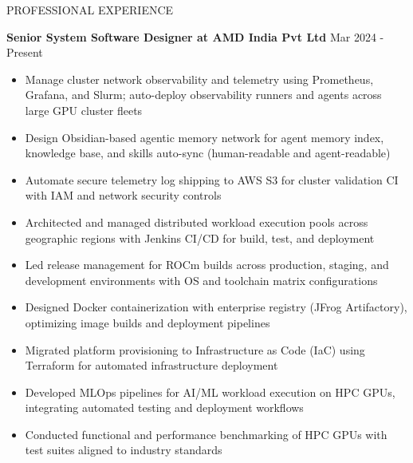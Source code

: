 \documentclass{resume} %
\begin{document}
\begin{rSection}{PROFESSIONAL EXPERIENCE}

{\bf Senior System Software Designer at AMD India Pvt Ltd} \hfill {Mar 2024 - Present }
\begin{itemize}
    \item Manage cluster network observability and telemetry using Prometheus, Grafana, and Slurm; auto-deploy observability runners and agents across large GPU cluster fleets
    \item Design Obsidian-based agentic memory network for agent memory index, knowledge base, and skills auto-sync (human-readable and agent-readable)
    \item Automate secure telemetry log shipping to AWS S3 for cluster validation CI with IAM and network security controls
    \item Architected and managed distributed workload execution pools across geographic regions with Jenkins CI/CD for build, test, and deployment
    \item Led release management for ROCm builds across production, staging, and development environments with OS and toolchain matrix configurations
    \item Designed Docker containerization with enterprise registry (JFrog Artifactory), optimizing image builds and deployment pipelines
    \item Migrated platform provisioning to Infrastructure as Code (IaC) using Terraform for automated infrastructure deployment
    \item Developed MLOps pipelines for AI/ML workload execution on HPC GPUs, integrating automated testing and deployment workflows
    \item Conducted functional and performance benchmarking of HPC GPUs with test suites aligned to industry standards
\end{itemize}


\end{rSection}
\end{document}
